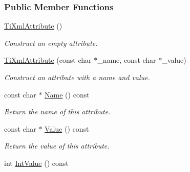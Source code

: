 \subsubsection*{Public Member Functions}
\begin{DoxyCompactItemize}
\item 
\hypertarget{class_ti_xml_attribute_a9cfa3c8179873fd485d83003b114f8e1}{
\hyperlink{class_ti_xml_attribute_a9cfa3c8179873fd485d83003b114f8e1}{TiXmlAttribute} ()}
\label{class_ti_xml_attribute_a9cfa3c8179873fd485d83003b114f8e1}

\begin{DoxyCompactList}\small\item\em Construct an empty attribute. \item\end{DoxyCompactList}\item 
\hypertarget{class_ti_xml_attribute_a759d0b76fb8fcf765ecab243bc14f05e}{
\hyperlink{class_ti_xml_attribute_a759d0b76fb8fcf765ecab243bc14f05e}{TiXmlAttribute} (const char $\ast$\_\-name, const char $\ast$\_\-value)}
\label{class_ti_xml_attribute_a759d0b76fb8fcf765ecab243bc14f05e}

\begin{DoxyCompactList}\small\item\em Construct an attribute with a name and value. \item\end{DoxyCompactList}\item 
\hypertarget{class_ti_xml_attribute_a298a57287d305904ba6bd96ae6f78d3d}{
const char $\ast$ \hyperlink{class_ti_xml_attribute_a298a57287d305904ba6bd96ae6f78d3d}{Name} () const }
\label{class_ti_xml_attribute_a298a57287d305904ba6bd96ae6f78d3d}

\begin{DoxyCompactList}\small\item\em Return the name of this attribute. \item\end{DoxyCompactList}\item 
\hypertarget{class_ti_xml_attribute_a0f874490eac8ca00ee0070765d0e97e3}{
const char $\ast$ \hyperlink{class_ti_xml_attribute_a0f874490eac8ca00ee0070765d0e97e3}{Value} () const }
\label{class_ti_xml_attribute_a0f874490eac8ca00ee0070765d0e97e3}

\begin{DoxyCompactList}\small\item\em Return the value of this attribute. \item\end{DoxyCompactList}\item 
\hypertarget{class_ti_xml_attribute_aa1a20ad59dc7e89a0ab265396360d50f}{
int \hyperlink{class_ti_xml_attribute_aa1a20ad59dc7e89a0ab265396360d50f}{IntValue} () const }
\label{class_ti_xml_attribute_aa1a20ad59dc7e89a0ab265396360d50f}


\end{DoxyCompactItemize}
